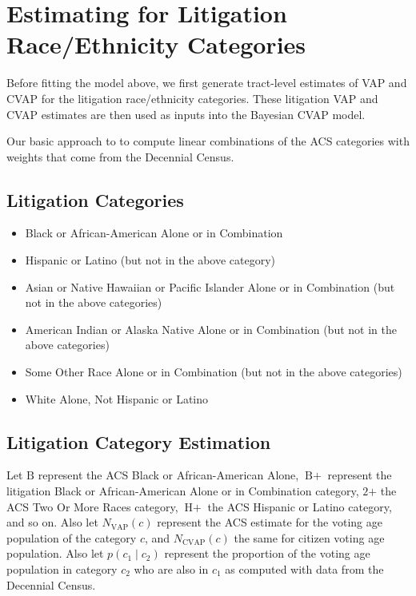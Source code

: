 \documentclass{article}
\begin{document}
\section{Estimating for Litigation Race/Ethnicity Categories}
Before fitting the model above, we first generate tract-level estimates of VAP and CVAP for the litigation race/ethnicity categories. These litigation VAP and CVAP estimates are then used as inputs into the Bayesian CVAP model.

Our basic approach to to compute linear combinations of the ACS categories with weights that come from the Decennial Census.

\subsection{Litigation Categories}
\begin{itemize}
    \item Black or African-American Alone or in Combination
    \item Hispanic or Latino (but not in the above category)
    \item Asian or Native Hawaiian or Pacific Islander Alone or in Combination (but not in the above categories)
    \item American Indian or Alaska Native Alone or in Combination (but not in the above categories)
    \item Some Other Race Alone or in Combination (but not in the above categories)
    \item White Alone, Not Hispanic or Latino
\end{itemize}

\subsection{Litigation Category Estimation}
Let $\text{B}$ represent the ACS Black or African-American Alone, $\text{B}+$ represent the litigation Black or African-American Alone or in Combination category, $\text{2+}$ the ACS Two Or More Races category, $\text{H}+$ the ACS Hispanic or Latino category, and so on. Also let $N_\text{VAP}(c)$ represent the ACS estimate for the voting age population of the category $c$, and $N_\text{CVAP}(c)$ the same for citizen voting age population. Also let $p(c_1 \mid c_2)$ represent the proportion of the voting age population in category $c_2$ who are also in $c_1$ as computed with data from the Decennial Census.
\end{document}
